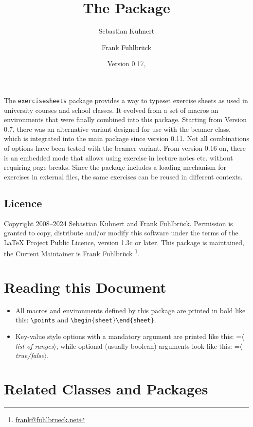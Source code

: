 \documentclass[DIV12,BCOR0mm]{scrartcl}
\title{The \exsh Package}
\author{Sebastian Kuhnert\and Frank Fuhlbrück}
\date{Version 0.17, \printdateTeX{2024/04/23}}
\newcommand{\exsh}{\texttt{exercisesheets}\xspace}
\newcommand{\param}[1]{$\langle${\normalfont\itshape #1\/}$\rangle$}
\newcommand{\maybe}[1]{\textcolor{green!50!black}{#1}}
\newcommand{\codestyle}{\normalfont\ttfamily\color{blue!50!black}}
\newcommand{\optionstyle}{\normalfont\ttfamily\color{red!50!black}}
\newcommand{\option}[1]{{\optionstyle #1}}
\newcommand{\vers}[1]{{\normalfont\ttfamily\color{black!90} #1}}
\begin{document}
\maketitle

The \exsh package provides a way to typeset exercise sheets as used in university courses and school classes. It evolved from a set of macros an environments that were finally combined into this package. Starting from Version \vers{0.7}, there was an alternative variant designed for use with the beamer class, which is integrated into the main package since version \vers{0.11}. Not all combinations of options have been tested with the beamer variant. From version \vers{0.16} on, there is an embedded mode that allows using exercise in lecture notes etc. without requiring page breaks. Since the package includes a loading mechanism for exercises in external files, the same exercises can be reused in different contexts.


\subsection*{Licence}
Copyright \textcopyright{} 2008--2024 Sebastian Kuhnert and Frank Fuhlbrück.
Permission is granted to copy, distribute and/or modify this software under the
terms of the \LaTeX{} Project Public Licence, version 1.3c or later. This
package is maintained, the Current Maintainer is
Frank Fuhlbrück
\footnote{\href{mailto:frank@fuhlbrueck.net}{frank@fuhlbrueck.net}}.


\section{Reading this Document}

\begin{itemize}
  \item All macros and environments defined by this package are
    printed in bold like this: \lstinline|\points| and
    \lstinline|\begin{sheet}\end{sheet}|.
  \item Key-value style options with a mandatory argument are
    printed like this: {\codestyle \option{only}=\param{list of ranges}}, while optional (usually boolean) arguments
    look like this: {\codestyle \option{embedded}\maybe{=\param{true/false}}}.
\end{itemize}




\section{Related Classes and Packages}
\end{document}
